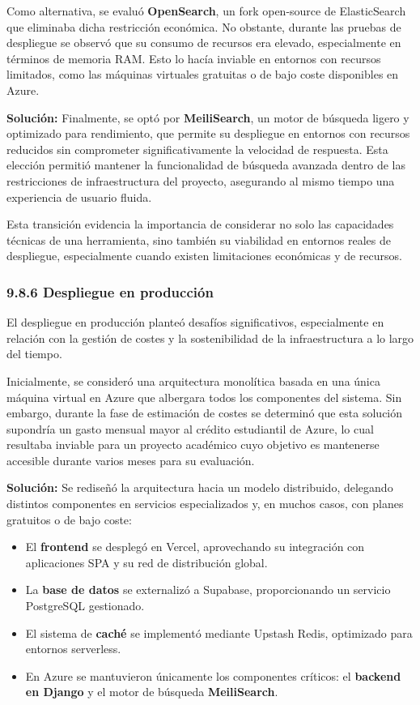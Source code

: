 Como alternativa, se evaluó \textbf{OpenSearch}, un fork open-source de ElasticSearch que eliminaba dicha restricción económica. No obstante, durante las pruebas de despliegue se observó que su consumo de recursos era elevado, especialmente en términos de memoria RAM. Esto lo hacía inviable en entornos con recursos limitados, como las máquinas virtuales gratuitas o de bajo coste disponibles en Azure.
 
\textbf{Solución:} Finalmente, se optó por \textbf{MeiliSearch}, un motor de búsqueda ligero y optimizado para rendimiento, que permite su despliegue en entornos con recursos reducidos sin comprometer significativamente la velocidad de respuesta. Esta elección permitió mantener la funcionalidad de búsqueda avanzada dentro de las restricciones de infraestructura del proyecto, asegurando al mismo tiempo una experiencia de usuario fluida.
 
Esta transición evidencia la importancia de considerar no solo las capacidades técnicas de una herramienta, sino también su viabilidad en entornos reales de despliegue, especialmente cuando existen limitaciones económicas y de recursos.
 
\subsubsection{9.8.6 Despliegue en producción}
 
El despliegue en producción planteó desafíos significativos, especialmente en relación con la gestión de costes y la sostenibilidad de la infraestructura a lo largo del tiempo.
 
Inicialmente, se consideró una arquitectura monolítica basada en una única máquina virtual en Azure que albergara todos los componentes del sistema. Sin embargo, durante la fase de estimación de costes se determinó que esta solución supondría un gasto mensual mayor al crédito estudiantil de Azure, lo cual resultaba inviable para un proyecto académico cuyo objetivo es mantenerse accesible durante varios meses para su evaluación.
 
\textbf{Solución:} Se rediseñó la arquitectura hacia un modelo distribuido, delegando distintos componentes en servicios especializados y, en muchos casos, con planes gratuitos o de bajo coste:
\begin{itemize}
    \item El \textbf{frontend} se desplegó en Vercel, aprovechando su integración con aplicaciones SPA y su red de distribución global.
    \item La \textbf{base de datos} se externalizó a Supabase, proporcionando un servicio PostgreSQL gestionado.
    \item El sistema de \textbf{caché} se implementó mediante Upstash Redis, optimizado para entornos serverless.
    \item En Azure se mantuvieron únicamente los componentes críticos: el \textbf{backend en Django} y el motor de búsqueda \textbf{MeiliSearch}.
\end{itemize}
 
